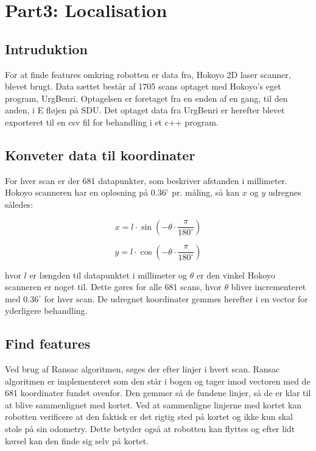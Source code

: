 



\section{Part3: Localisation}
\subsection{Intruduktion}
For at finde features omkring robotten er data fra, Hokoyo 2D laser scanner, blevet brugt. Data sættet består af 1705 scans optaget med Hokoyo's eget program, UrgBenri. Optagelsen er foretaget fra en enden af en gang, til den anden, i E fløjen på SDU. Det optaget data fra UrgBenri er herefter blevet exporteret til en csv fil for behandling i et c++ program. 

\subsection{Konveter data til koordinater}
For hver scan er der 681 datapunkter, som beskriver afstanden i millimeter. Hokoyo scanneren har en opløsning på $0.36^\circ$ pr. måling, så kan $x$ og $y$ udregnes således:

\begin{equation}
x=l\cdot \sin\left(-\theta\cdot \frac{\pi}{180^\circ}\right)
\end{equation}

\begin{equation}
y=l\cdot \cos\left(-\theta\cdot \frac{\pi}{180^\circ}\right)
\end{equation}

hvor $l$ er længden til datapunktet i millimeter og $\theta$ er den vinkel Hokoyo scanneren er noget til. Dette gøres for alle 681 scans, hvor $\theta$ bliver incrementeret med $ 0.36^\circ$ for hver scan. De udregnet koordinater gemmes herefter i en vector for yderligere behandling. 

\subsection{Find features}
Ved brug af Ransac algoritmen, søges der efter linjer i hvert scan. Ransac algoritmen er implementeret som den står i bogen og tager imod vectoren med de 681 koordinater fundet ovenfor. Den gemmer så de fundene linjer, så de er klar til at blive sammenlignet med kortet. Ved at sammenligne linjerne med kortet kan robotten verificere at den faktisk er det rigtig sted på kortet og ikke kun skal stole på sin odometry. Dette betyder også at robotten kan flyttes og efter lidt kørsel kan den finde sig selv på kortet.



 

